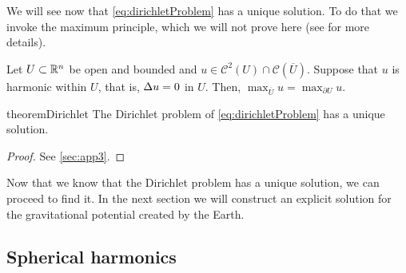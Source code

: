 \documentclass[../main.tex]{subfiles}
\begin{document}
We will see now that \cref{eq:dirichletProblem} has a unique solution. To do that we invoke the maximum principle, which we will not prove here (see \cite{evans} for more details).
\begin{theorem}
  Let $U\subset \mathbb{R}^n$ be open and bounded and $u\in\mathcal{C}^2(U)\cap \mathcal{C}(\overline{U})$. Suppose that $u$ is harmonic within $U$, that is, $\Delta u=0$ in $U$. Then, $\max_{\overline{U}}u=\max_{\partial U}u$.
\end{theorem}
\begin{restatable}{theorem}{Dirichlet}\label{thm:max_principle}
  The Dirichlet problem of \cref{eq:dirichletProblem} has a unique solution.
\end{restatable}
\begin{proof}
  See \cref{sec:app3}.
\end{proof}
Now that we know that the Dirichlet problem has a unique solution, we can proceed to find it. In the next section we will construct an explicit solution for the gravitational potential created by the Earth.
\subsection{Spherical harmonics}
\end{document}
